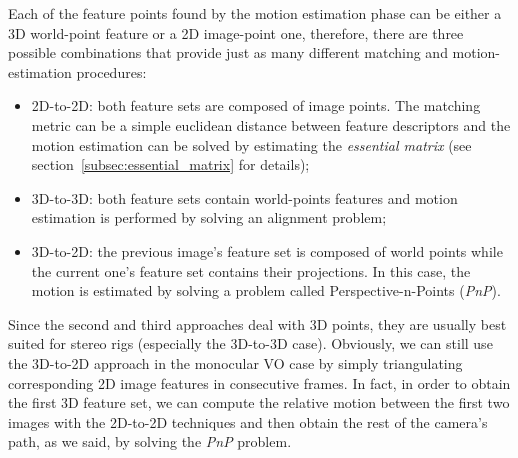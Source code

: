 Each of the feature points found by the motion estimation phase can be 
either a 3D world-point feature or a 2D image-point one,
therefore, there are three possible combinations that provide just as many 
different matching and motion-estimation procedures:
\begin{itemize}
	\item 2D-to-2D: both feature sets are composed of image points.
The matching metric can be a simple euclidean distance between feature 
descriptors and the motion estimation can be solved by estimating the 
\textit{essential matrix} (see section~\ref{subsec:essential_matrix} for 
details);
	\item 3D-to-3D: both feature sets contain world-points features and motion
estimation is performed by solving an alignment problem;
	\item 3D-to-2D: the previous image's feature set is composed of world points while
the current one's feature set contains their projections. In this case, the motion 
is estimated by solving a problem called Perspective-n-Points (\textit{PnP}).
\end{itemize}
Since the second and third approaches deal with 3D points, they are usually 
best suited for stereo rigs (especially the 3D-to-3D case).
Obviously, we can still use the 3D-to-2D approach in the monocular VO case by simply 
triangulating corresponding 2D image features in consecutive frames.
In fact, in order to obtain the first 3D feature set,
we can compute the relative motion between the first two images with 
the 2D-to-2D techniques and then obtain the rest of the camera's path,
as we said, by solving the \textit{PnP} problem.
%
